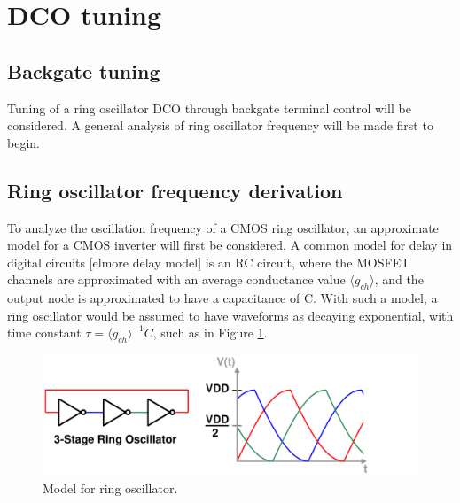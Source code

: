 \documentclass[10pt,a4paper]{article}
\begin{document}
	\section{DCO tuning}
	\subsection{Backgate tuning}
	\normalsize
	Tuning of a ring oscillator DCO through backgate terminal control will be considered. A general analysis of ring oscillator frequency will be made first to begin.

	\subsection{Ring oscillator frequency derivation}
	To analyze the oscillation frequency of a CMOS ring oscillator, an approximate model for a CMOS inverter will first be considered. A common model for delay in digital circuits [elmore delay model] is an RC circuit, where the MOSFET channels are approximated with an average conductance value $\langle g_{ch} \rangle$, and the output node is approximated to have a capacitance of C. With such a model, a ring oscillator would be assumed to have waveforms as decaying exponential, with time constant $\tau = \langle g_{ch} \rangle^{-1}C$, such as in Figure \ref{fig:rosc_rc}.
	\begin{figure}[htb!]
		\center\includegraphics[width=0.8\linewidth, angle=0]{figs/inv_waves3.pdf}
		\caption{Model for ring oscillator.}
		\label{fig:rosc_rc}
	\end{figure}
\end{document}
